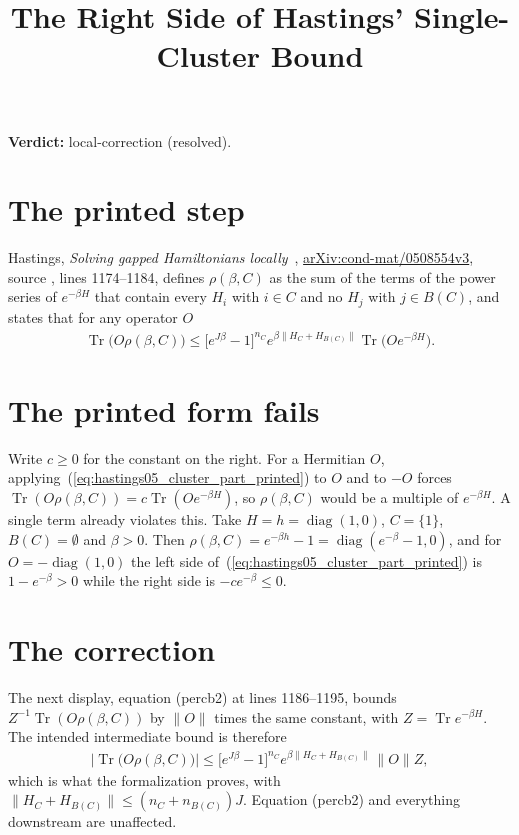 \documentclass{article}
\title{The Right Side of Hastings' Single-Cluster Bound}
\author{}
\date{}
\providecommand{\gapnote}[2]{\par\noindent\textbf{Verdict:} #1 (#2).\par}
\begin{document}
\maketitle
\gapnote{local-correction}{resolved}

\section{The printed step}
Hastings, \emph{Solving gapped Hamiltonians locally}~\cite{Hastings2006Solving},
\href{https://arxiv.org/abs/cond-mat/0508554v3}{arXiv:cond-mat/0508554v3},
source , lines 1174--1184, defines $\rho(\beta,C)$ as the
sum of the terms of the power series of $e^{-\beta H}$ that contain every
$H_i$ with $i\in C$ and no $H_j$ with $j\in B(C)$, and states that for any
operator $O$
\begin{align}
 \operatorname{Tr}\bigl(O\rho(\beta,C)\bigr)
 \le\bigl[e^{J\beta}-1\bigr]^{n_C}e^{\beta\|H_C+H_{B(C)}\|}
 \operatorname{Tr}\bigl(Oe^{-\beta H}\bigr).
 \label{eq:hastings05_cluster_part_printed}
\end{align}

\section{The printed form fails}
Write $c\ge0$ for the constant on the right. For a Hermitian $O$,
applying~(\ref{eq:hastings05_cluster_part_printed}) to $O$ and to $-O$ forces
$\operatorname{Tr}(O\rho(\beta,C))=c\operatorname{Tr}(Oe^{-\beta H})$, so
$\rho(\beta,C)$ would be a multiple of $e^{-\beta H}$. A single term already
violates this. Take $H=h=\operatorname{diag}(1,0)$, $C=\{1\}$, $B(C)=\emptyset$
and $\beta>0$. Then $\rho(\beta,C)=e^{-\beta h}-1=\operatorname{diag}(e^{-\beta}-1,0)$,
and for $O=-\operatorname{diag}(1,0)$ the left side
of~(\ref{eq:hastings05_cluster_part_printed}) is $1-e^{-\beta}>0$ while the
right side is $-ce^{-\beta}\le0$.

\section{The correction}
The next display, equation (percb2) at lines 1186--1195, bounds
$Z^{-1}\operatorname{Tr}(O\rho(\beta,C))$ by $\|O\|$ times the same constant,
with $Z=\operatorname{Tr}e^{-\beta H}$. The intended intermediate bound is
therefore
\begin{align}
 \bigl|\operatorname{Tr}\bigl(O\rho(\beta,C)\bigr)\bigr|
 \le\bigl[e^{J\beta}-1\bigr]^{n_C}e^{\beta\|H_C+H_{B(C)}\|}\,\|O\|Z,
 \label{eq:hastings05_cluster_part_corrected}
\end{align}
which is what the formalization proves, with
$\|H_C+H_{B(C)}\|\le(n_C+n_{B(C)})J$. Equation (percb2) and everything
downstream are unaffected.


\end{document}
